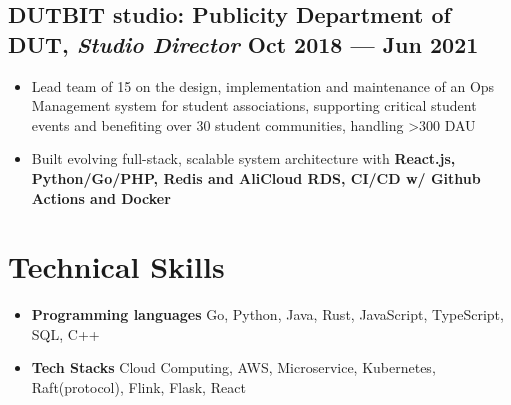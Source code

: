 \documentclass[a4,12pt]{article}
\newenvironment{zitemize}{
\begin{itemize}\itemsep0pt \parskip0pt \parsep1pt}
{\end{itemize}\vspace{-0.5cm}}
\begin{document}
\vspace{-0.1cm}

\subsection*{DUTBIT studio: {\normalsize\normalfont Publicity Department of DUT, \textit{Studio Director}} \hfill  Oct 2018 --- Jun 2021} 

    \begin{zitemize}
        \item Lead team of 15 on the design, implementation and maintenance of an Ops Management system for student associations, supporting critical student events and benefiting over 30 student communities, handling >300 DAU
        \item Built evolving full-stack, scalable system architecture with \textbf{React.js, Python/Go/PHP, Redis and AliCloud RDS, CI/CD w/ Github Actions and Docker}
    \end{zitemize}

\vspace{-0.4cm}
\section{\textbf{Technical Skills}}
\vspace{-0.2cm}
\begin{zitemize}
    \item \textbf{Programming languages} Go, Python, Java, Rust, JavaScript, TypeScript, SQL, C++
    \item \textbf{Tech Stacks} Cloud Computing, AWS, Microservice, Kubernetes, Raft(protocol), Flink, Flask, React
\end{zitemize}
\end{document}

